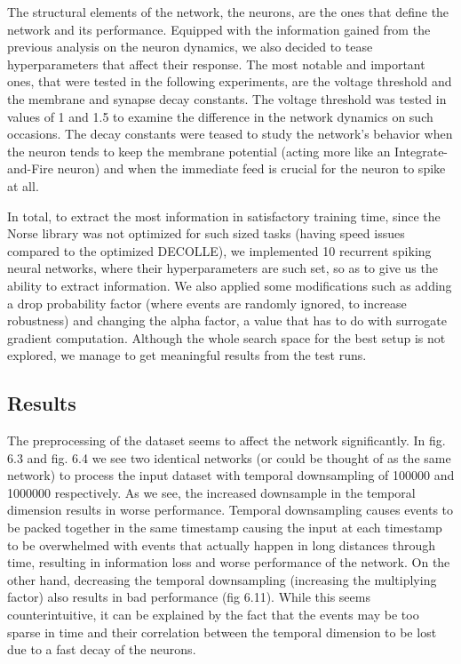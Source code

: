 \documentclass[12pt]{report}
\begin{document}
The structural elements of the network, the neurons, are the ones that define the network and its performance. Equipped with the information gained from the previous analysis on the neuron dynamics, we also decided to tease hyperparameters that affect their response. The most notable and important ones, that were tested in the following experiments, are the voltage threshold and the membrane and synapse decay constants. The voltage threshold was tested in values of 1 and 1.5 to examine the difference in the network dynamics on such occasions. The decay constants were teased to study the network's behavior when the neuron tends to keep the membrane potential (acting more like an Integrate-and-Fire neuron) and when the immediate feed is crucial for the neuron to spike at all.

In total, to extract the most information in satisfactory training time, since the Norse library was not optimized for such sized tasks (having speed issues compared to the optimized DECOLLE), we implemented 10 recurrent spiking neural networks, where their hyperparameters are such set, so as to give us the ability to extract information. We also applied some modifications such as adding a drop probability factor (where events are randomly ignored, to increase robustness) and changing the alpha factor, a value that has to do with surrogate gradient computation. Although the whole search space for the best setup is not explored, we manage to get meaningful results from the test runs.

\subsection{Results}

The preprocessing of the dataset seems to affect the network significantly. In fig. 6.3 and fig. 6.4 we see two identical networks (or could be thought of as the same network) to process the input dataset with temporal downsampling of 100000 and 1000000 respectively. As we see, the increased downsample in the temporal dimension results in worse performance. Temporal downsampling causes events to be packed together in the same timestamp causing the input at each timestamp to be overwhelmed with events that actually happen in long distances through time, resulting in information loss and worse performance of the network. On the other hand, decreasing the temporal downsampling (increasing the multiplying factor) also results in bad performance (fig 6.11). While this seems counterintuitive, it can be explained by the fact that the events may be too sparse in time and their correlation between the temporal dimension to be lost due to a fast decay of the neurons.
\end{document}
